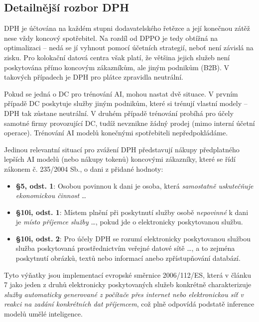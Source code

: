 \subsection{Detailnější rozbor DPH}
\label{subsec:cz_dph}

DPH je účtována na každém stupni dodavatelského řetězce a její konečnou zátěž nese vždy koncový spotřebitel. Na rozdíl od DPPO je tedy obtížná na optimalizaci -- nedá se jí vyhnout pomocí účetních strategií, neboť není závislá na zisku. Pro kolokační datová centra však platí, že většina jejich služeb není poskytována přímo koncovým zákazníkům, ale jiným podnikům (B2B). V takových případech je DPH pro plátce zpravidla neutrální.

Pokud se jedná o DC pro trénování AI, mohou nastat dvě situace. V prvním případě DC poskytuje služby jiným podnikům, které si trénují vlastní modely -- DPH tak zůstane neutrální. V druhém případě trénování probíhá pro účely samotné firmy provozující DC, tudíž nevznikne žádný prodej (mimo interní účetní operace). Trénování AI modelů konečnými spotřebiteli nepředpokládáme.

Jedinou relevantní situací pro zvážení DPH představují nákupy předplatného lepších AI modelů (nebo nákupy tokenů) koncovými zákazníky, které se řídí zákonem č. 235/2004 Sb., o dani z přidané hodnoty:

\begin{itemize}
    \item \textbf{§5, odst. 1}: Osobou povinnou k dani je osoba, která \textit{samostatně uskutečňuje ekonomickou činnost} \dots{}
    \item \textbf{§10i, odst. 1}: Místem plnění při poskytnutí služby osobě \textit{nepovinné} k dani je \textit{místo příjemce služby} \dots{}, pokud jde o elektronicky poskytovanou službu.
    \item \textbf{§10i, odst. 2}: Pro účely DPH se rozumí elektronicky poskytovanou službou služba poskytovaná prostřednictvím veřejné datové sítě \dots{}, a to zejména poskytnutí obrázků, textů nebo informací anebo zpřístupňování databází.
\end{itemize}

Tyto výňatky jsou implementací evropské směrnice 2006/112/ES, která v článku 7 jako jeden z druhů elektronicky poskytovaných služeb konkrétně charakterizuje \textit{služby automaticky generované z počítače přes internet nebo elektronickou síť v reakci na zadání konkrétních dat příjemcem}, což plně odpovídá podstatě inference modelů umělé inteligence.

